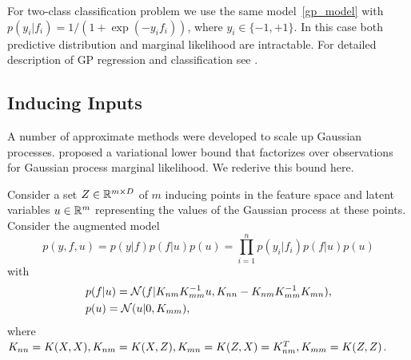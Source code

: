   For two-class classification problem we use the same model~\eqref{gp_model} 
  with $p(y_i | f_i)=1/(1+\exp(-y_if_i))$, where $y_i\in\{-1,+1\}$. In this case
  both predictive distribution and marginal likelihood are intractable. For 
  detailed description of GP regression and classification see \citet{rasmussen2006}.

\subsection{Inducing Inputs}
\label{inducing_inputs}

  A number of approximate methods were developed to scale up Gaussian processes.
  \citet{hensman2013} proposed a variational lower bound that factorizes over
  observations for Gaussian process marginal likelihood. We rederive
  this bound here.

  Consider a set $Z \in \mathbb{R}^{m \times D}$ of $m$ inducing points in the feature 
  space and latent variables $u \in \mathbb{R}^m$ representing the values of
  the Gaussian process at these points. Consider the augmented model
  \[
    p(y, f, u) = p(y | f) p(f | u) p(u) = \prod_{i = 1}^ n p(y_i | f_i) p(f | u) p(u)
  \]
  with 
  \begin{equation}
  \label{priors}
  \begin{split}
    &p(f | u) = \mathcal{N}(f | K_{nm} K_{mm}^{-1} u, K_{nn} - K_{nm} K_{mm}^{-1} K_{mn}),\\
    &p(u)= \mathcal{N}(u | 0, K_{mm}),
  \end{split}
  \end{equation}
  where $K_{nn} = K(X, X), K_{nm} = K(X, Z), K_{mn} = K(Z, X) = K_{nm}^T, K_{mm} = K(Z, Z)$.


